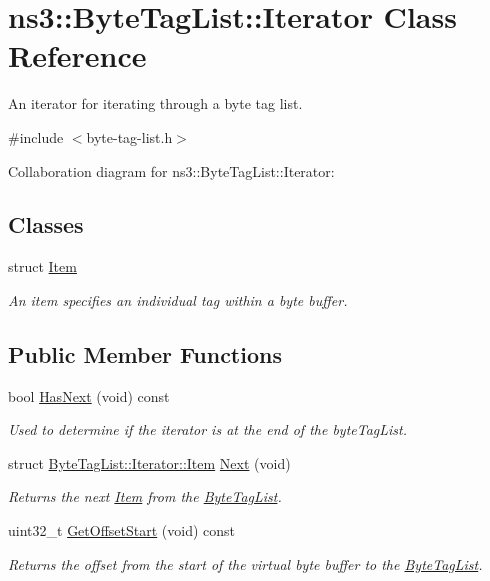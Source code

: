 \hypertarget{classns3_1_1ByteTagList_1_1Iterator}{}\section{ns3\+:\+:Byte\+Tag\+List\+:\+:Iterator Class Reference}
\label{classns3_1_1ByteTagList_1_1Iterator}


An iterator for iterating through a byte tag list.  




{\ttfamily \#include $<$byte-\/tag-\/list.\+h$>$}



Collaboration diagram for ns3\+:\+:Byte\+Tag\+List\+:\+:Iterator\+:
\subsection*{Classes}
\begin{DoxyCompactItemize}
\item 
struct \hyperlink{structns3_1_1ByteTagList_1_1Iterator_1_1Item}{Item}
\begin{DoxyCompactList}\small\item\em An item specifies an individual tag within a byte buffer. \end{DoxyCompactList}\end{DoxyCompactItemize}
\subsection*{Public Member Functions}
\begin{DoxyCompactItemize}
\item 
bool \hyperlink{classns3_1_1ByteTagList_1_1Iterator_aa1c5eb37f289d0eef8dfaf687498eaec}{Has\+Next} (void) const 
\begin{DoxyCompactList}\small\item\em Used to determine if the iterator is at the end of the byte\+Tag\+List. \end{DoxyCompactList}\item 
struct \hyperlink{structns3_1_1ByteTagList_1_1Iterator_1_1Item}{Byte\+Tag\+List\+::\+Iterator\+::\+Item} \hyperlink{classns3_1_1ByteTagList_1_1Iterator_af521864d800baab1d9c5262f59ce4433}{Next} (void)
\begin{DoxyCompactList}\small\item\em Returns the next \hyperlink{structns3_1_1ByteTagList_1_1Iterator_1_1Item}{Item} from the \hyperlink{classns3_1_1ByteTagList}{Byte\+Tag\+List}. \end{DoxyCompactList}\item 
uint32\+\_\+t \hyperlink{classns3_1_1ByteTagList_1_1Iterator_a3dbfd8531dac30a62afb37317937d974}{Get\+Offset\+Start} (void) const 
\begin{DoxyCompactList}\small\item\em Returns the offset from the start of the virtual byte buffer to the \hyperlink{classns3_1_1ByteTagList}{Byte\+Tag\+List}. \end{DoxyCompactList}\end{DoxyCompactItemize}
